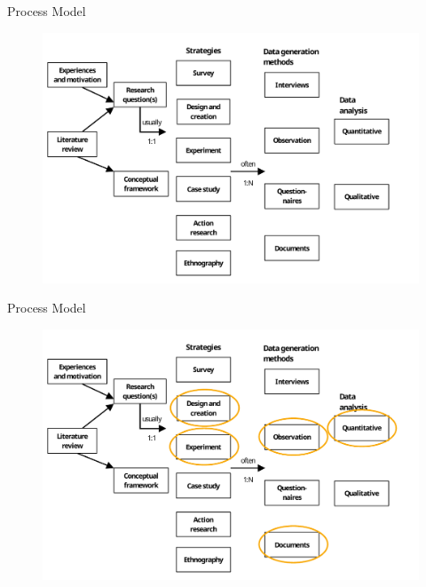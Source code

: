 \documentclass[10pt]{beamer}
\begin{document}
\begin{frame}{Process Model}
\begin{figure}
    \centering
    \includegraphics[width=\textwidth]{modelo_proceso.pdf}
\end{figure}
\end{frame}

\begin{frame}{Process Model}
\begin{figure}
    \centering
    \includegraphics[width=\textwidth]{modelo_proceso_circle.pdf}
\end{figure}
\end{frame}
\end{document}

